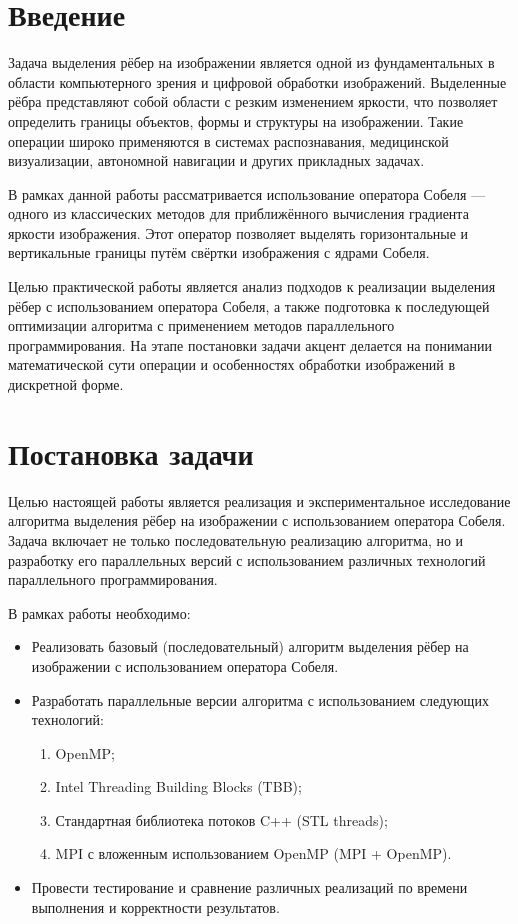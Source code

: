 \documentclass[14pt,a4paper]{extarticle}
\begin{document}
\tableofcontents
\newpage

\section{Введение}

Задача выделения рёбер на изображении является одной из фундаментальных в области компьютерного зрения и цифровой обработки изображений. Выделенные рёбра представляют собой области с резким изменением яркости, что позволяет определить границы объектов, формы и структуры на изображении. Такие операции широко применяются в системах распознавания, медицинской визуализации, автономной навигации и других прикладных задачах.

В рамках данной работы рассматривается использование оператора Собеля — одного из классических методов для приближённого вычисления градиента яркости изображения. Этот оператор позволяет выделять горизонтальные и вертикальные границы путём свёртки изображения с ядрами Собеля.

Целью практической работы является анализ подходов к реализации выделения рёбер с использованием оператора Собеля, а также подготовка к последующей оптимизации алгоритма с применением методов параллельного программирования. На этапе постановки задачи акцент делается на понимании математической сути операции и особенностях обработки изображений в дискретной форме.

\section*{Постановка задачи}

Целью настоящей работы является реализация и экспериментальное исследование алгоритма выделения рёбер на изображении с использованием оператора Собеля. Задача включает не только последовательную реализацию алгоритма, но и разработку его параллельных версий с использованием различных технологий параллельного программирования.

В рамках работы необходимо:

\begin{itemize}
    \item Реализовать базовый (последовательный) алгоритм выделения рёбер на изображении с использованием оператора Собеля.
    \item Разработать параллельные версии алгоритма с использованием следующих технологий:
    \begin{enumerate}
        \item OpenMP;
        \item Intel Threading Building Blocks (TBB);
        \item Стандартная библиотека потоков C++ (STL threads);
        \item MPI с вложенным использованием OpenMP (MPI + OpenMP).
    \end{enumerate}
    \item Провести тестирование и сравнение различных реализаций по времени выполнения и корректности результатов.
\end{itemize}
\end{document}
